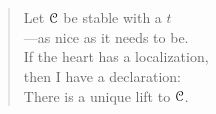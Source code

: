 
\thispagestyle{plain}
\section*{}

\vspace*{7cm}


\begin{verse}
    \hspace{8em}Let $\EuScript{C}$ be stable with a $t$ \\
    \vspace{5pt}
    \hspace{8em}---as nice as it needs to be. \\
    \vspace{5pt}
    \hspace{8em}If the heart has a localization, \\
    \vspace{5pt}
    \hspace{8em}then I have a declaration: \\
    \vspace{5pt}
    \hspace{8em}There is a unique lift to $\EuScript{C}$. 

\end{verse}